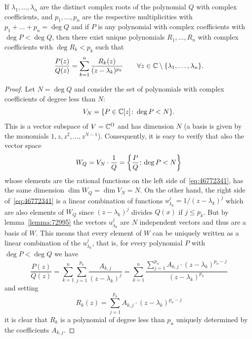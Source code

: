 \begin{theorem}
\label{th:fratti_semplici_complessi}%
%
%
%
If $\lambda_1, \dots, \lambda_n$ are the distinct complex roots
of the polynomial $Q$ with complex coefficients,
and $p_1,\dots, p_n$ are the respective multiplicities
with $p_1 + \dots + p_n = \deg Q$
and if $P$ is any polynomial with complex coefficients
with $\deg P < \deg Q$,
then there exist unique polynomials $R_1, \dots, R_n$
with complex coefficients with $\deg R_k < p_k$ such that
\begin{equation}\label{eq:46772341}
  \frac{P(z)}{Q(z)}
  = \sum_{k=1}^n \frac{R_k(z)}{(z-\lambda_k)^{p_k}}
  \qquad \forall z \in {\mathbb C}\setminus{\left\{ \lambda_1,\dots,\lambda_n \right\}}.
\end{equation}
\end{theorem}
%
\begin{proof}
Let $N=\deg Q$ and consider
the set of polynomials with complex coefficients
of degree less than $N$:
\[
  V_N = {\left\{ P\in {\mathbb C}[z]\colon \deg P < N \right\}}.
\]
This is a vector subspace of
$V={\mathbb C}^\Omega$ and has dimension
$N$ (a basis is given by the monomials $1, z, z^2, \dots, z^{N-1}$).
Consequently, it is easy to verify that also the vector space
\[
  W_Q = V_N \cdot \frac{1}{Q} = {\left\{ \frac{P}{Q}\colon \text{$\deg P < N$} \right\}}
\]
whose elements are the rational functions on the left side
of~\eqref{eq:46772341},
has the same dimension $\dim W_Q = \dim V_N = N$.
On the other hand, the right side of~\eqref{eq:46772341}
is a linear combination of functions
$u_{\lambda_k}^j = 1/(z-\lambda_k)^j$ which are
also elements of $W_Q$ since $(z-\lambda_k)^j$ divides $Q(x)$
if $j\le p_k$.
But by lemma~\ref{lemma:72995} the vectors $u_{\lambda_k}^j$ are
$N$ independent vectors and thus
are a basis of $W$.
This means that every element of $W$ can
be uniquely written as a linear combination of the
$u_{\lambda_k}^j$, that is, for every
polynomial $P$ with $\deg P < \deg Q$ we have
\begin{equation}\label{eq:458934}
 \frac{P(z)}{Q(z)}
 = \sum_{k=1}^n \sum_{j=1}^{p_k} \frac{A_{k,j}}{(z-\lambda_k)^j}
  = \sum_{k=1}^n \frac{\displaystyle \sum_{j=1}^{p_n} A_{k,j}\cdot
 (z-\lambda_k)^{p_n-j}}{(z-\lambda_k)^{p_n}}
\end{equation}
and setting
\[
  R_k(z) = \sum_{j=1}^{p_n} A_{k,j}\cdot(z-\lambda_k)^{p_n-j}
\]
it is clear that $R_k$ is a polynomial of degree less than $p_n$
uniquely determined by the coefficients $A_{k,j}$.
\end{proof}



